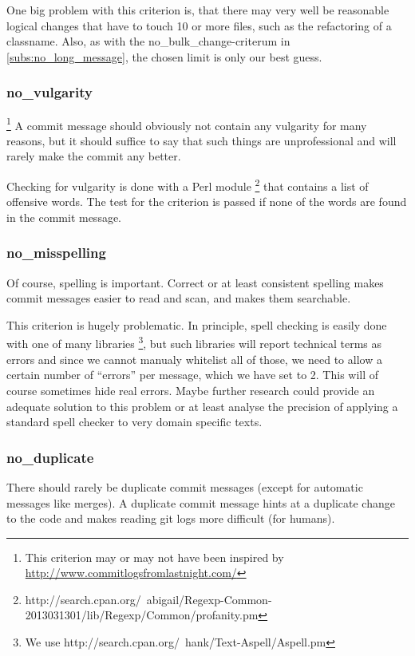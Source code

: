 One big problem with this criterion is, that there may very well be reasonable logical changes that have to touch 10 or more files, such as the refactoring of a classname. Also, as with the no_bulk_change-criterum in \ref{subs:no_long_message}, the chosen limit is only our best guess.

\subsubsection{no\_vulgarity}
\footnote{This criterion may or may not have been inspired by \url{http://www.commitlogsfromlastnight.com/}}
\label{subs:no_vulgarity}
A commit message should obviously not contain any vulgarity for many reasons, but it should suffice to say that such things are unprofessional and will rarely make the commit any better.

Checking for vulgarity is done with a Perl module \footnote{http://search.cpan.org/~abigail/Regexp-Common-2013031301/lib/Regexp/Common/profanity.pm} that contains a list of offensive words. The test for the criterion is passed if none of the words are found in the commit message.

\subsubsection{no\_misspelling}
\label{subs:no_misspelling}
Of course, spelling is important. Correct or at least consistent spelling makes commit messages easier to read and scan, and makes them searchable.

This criterion is hugely problematic. In principle, spell checking is easily done with one of many libraries \footnote{We use http://search.cpan.org/~hank/Text-Aspell/Aspell.pm}, but such libraries will report technical terms as errors and since we cannot manualy whitelist all of those, we need to allow a certain number of ``errors'' per message, which we have set to 2. This will of course sometimes hide real errors. Maybe further research could provide an adequate solution to this problem or at least analyse the precision of applying a standard spell checker to very domain specific texts.

\subsubsection{no\_duplicate}
\label{subs:no_duplicate}
There should rarely be duplicate commit messages (except for automatic messages like merges). A duplicate commit message hints at a duplicate change to the code and makes reading git logs more difficult (for humans).


